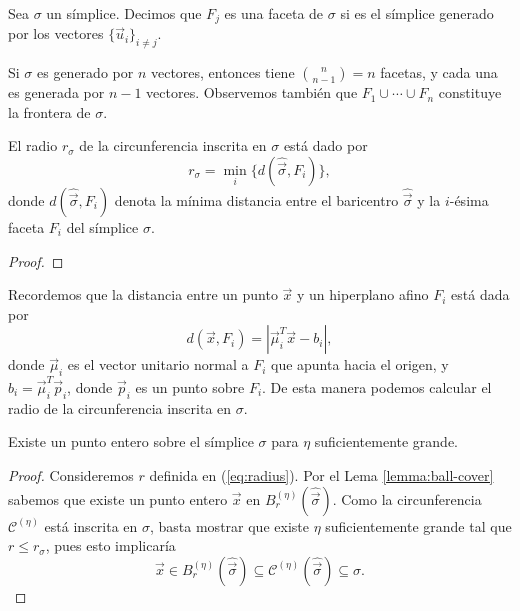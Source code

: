 \begin{definition}
	Sea $\sigma$ un símplice. Decimos que $F_j$ es una faceta de $\sigma$ si es el símplice generado
	por los vectores $\lbrace \vec{u}_i \rbrace_{i \neq j}$.
\end{definition}
\begin{observation}
	Si $\sigma$ es generado por $n$ vectores, entonces tiene $\binom{n}{n-1} = n$ facetas, y cada
	una es generada por $n - 1$ vectores. Observemos también que $F_1 \cup \cdots \cup F_n$
	constituye la frontera de $\sigma$.
\end{observation}
\begin{lemma}
	El radio $r_\sigma$ de la circunferencia inscrita en $\sigma$ está dado por
	\begin{equation*}
		r_\sigma = \min_{i} \lbrace d(\hat{\vec{\sigma}}, F_i) \rbrace,
	\end{equation*}
	donde $d(\hat{\vec{\sigma}}, F_i)$ denota la mínima distancia entre el baricentro
	$\hat{\vec{\sigma}}$ y la $i$-ésima faceta $F_i$ del símplice $\sigma$.
\end{lemma}
\begin{proof}
\end{proof}

Recordemos que la distancia entre un punto $\vec{x}$ y un hiperplano afino $F_i$ está dada por
\begin{equation*}
	d(\vec{x}, F_i) = |\vec{\mu}_i^T\vec{x} - b_i|,
\end{equation*}
donde $\vec{\mu}_i$ es el vector unitario normal a $F_i$ que apunta hacia el origen, y $b_i =
\vec{\mu}_i^T\vec{p}_i$, donde $\vec{p}_i$ es un punto sobre $F_i$. De esta manera podemos calcular
el radio de la circunferencia inscrita en $\sigma$.

\begin{theorem}
	Existe un punto entero sobre el símplice $\sigma$ para $\eta$ suficientemente grande.
\end{theorem}
\begin{proof}
	Consideremos $r$ definida en (\ref{eq:radius}). Por el Lema \ref{lemma:ball-cover} sabemos que
	existe un punto entero $\vec{x}$ en $B_r^{(\eta)}(\hat{\vec{\sigma}})$. Como la circunferencia
	$\mathcal{C}^{(\eta)}$ está inscrita en $\sigma$, basta mostrar que existe $\eta$
	suficientemente grande tal que $r \leq r_\sigma$, pues esto implicaría
	\begin{equation*}
		\vec{x} \in B_r^{(\eta)}(\hat{\vec{\sigma}}) \subseteq \mathcal{C}^{(\eta)}{(\hat{\vec{\sigma}})}
		\subseteq \sigma.
	\end{equation*}
\end{proof}

